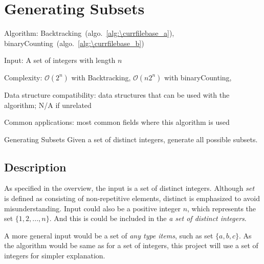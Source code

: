 \documentclass[catalog.tex]{subfiles}
\begin{document}
\def\pbname{Generating Subsets} %

\section{\pbname} 

\begin{overview}
\item [Algorithm:] Backtracking~(algo.~\ref{alg:\currfilebase_a}), binaryCounting~(algo.~\ref{alg:\currfilebase_b})
\item [Input:] A set of integers with length $n$
\item [Complexity:] $\mathcal{O}(2^n)$ with Backtracking, $\mathcal{O}(n2^n)$ with binaryCounting, 
\item [Data structure compatibility:] data structures that can be used with the algorithm; N/A if unrelated
\item [Common applications:] most common fields where this algorithm is used
\end{overview}


\begin{problem}{\pbname}
	Given a set of distinct integers, generate all possible subsets. 
\end{problem}


\subsection*{Description}
As specified in the overview, the input is a set of distinct integers. Although $set$ is defined as consisting of non-repetitive elements, distinct is emphasized to avoid misunderstanding. Input could also be a positive integer $n$, which represents the set $\{ 1, 2, ... ,n\}$. And this is could be included in the \textit{a set of distinct integers}. 

A more general input would be a set of \textit{any type items}, such as set $\{ a, b, c\}$. As the algorithm would be same as for a set of integers, this project will use a set of integers for simpler explanation. 
\end{document}
